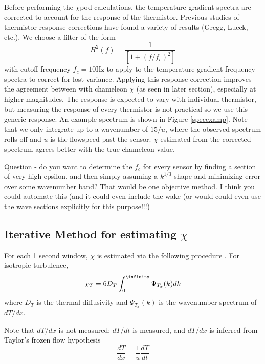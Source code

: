 \documentclass{ametsoc}
\begin{document}
Before performing the $\chi$pod calculations, the temperature gradient spectra are corrected to account for the response of the thermistor. Previous studies of thermistor response corrections have found a variety of results (Gregg, Lueck, etc.).  We choose a filter of the form 
\begin{equation}
H^2(f)=\frac{1}{[1+(f/f_c)^2]}
\end{equation}
with cutoff frequency $f_c=10$Hz to apply to the temperature gradient frequency spectra to correct for lost variance. Applying this response correction improves the agreement between with chameleon $\chi$ (as seen in later section), especially at higher magnitudes. The response is expected to vary with individual thermistor, but measuring the response of every thermistor is not practical so we use this generic response. An example spectrum is shown in Figure \ref{specexamp}. Note that we only integrate up to a wavenumber of $15/u$, where the observed spectrum rolls off and $u$ is the flowspeed past the sensor. $\chi$ estimated from the corrected spectrum agrees better with the true chameleon value.

Question - do you want to determine the $f_c$ for every sensor by finding a section of very high epsilon, and then simply assuming a $k^{1/3}$ shape and minimizing error over some wavenumber band?  That would be one objective method.  I think you could automate this (and it could even include the wake (or would could even use the wave sections explicitly for this purpose!!!)



\subsection{Iterative Method for estimating $\chi$}

For each 1 second window, $\chi$ is estimated via the following procedure \citep{moumnash09}. For isotropic turbulence,
\begin{equation}
\chi_T=6D_T \int_{0}^{\infinity}\Psi_{T_x} (k) dk
\label{eq:1}
\end{equation}
where $D_T$ is the thermal diffusivity and $\Psi_{T_x} (k)$ is the wavenumber spectrum of $dT/dx$.

Note that $dT/dx$ is not measured; $dT/dt$ is measured, and $dT/dx$ is inferred from Taylor's frozen flow hypothesis
 \begin{equation}
\frac{dT}{dx}=\frac{1}{u}\frac{dT}{dt}
\label{eq:2}
\end{equation}
\end{document}
